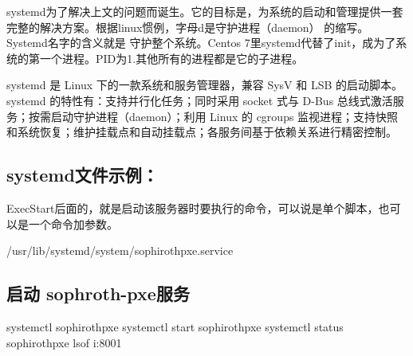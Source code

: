 \documentclass[letterpaper,10pt,english]{sphinxmanual}
\begin{document}
systemd为了解决上文的问题而诞生。它的目标是，为系统的启动和管理提供一套完整的解决方案。根据linux惯例，字母d是守护进程（daemon） 的缩写。Systemd名字的含义就是 守护整个系统。Centos 7里systemd代替了init，成为了系统的第一个进程。PID为1.其他所有的进程都是它的子进程。

systemd 是 Linux 下的一款系统和服务管理器，兼容 SysV 和 LSB 的启动脚本。systemd 的特性有：支持并行化任务；同时采用 socket 式与 D-Bus 总线式激活服务；按需启动守护进程（daemon）；利用 Linux 的 cgroups 监视进程；支持快照和系统恢复；维护挂载点和自动挂载点；各服务间基于依赖关系进行精密控制。


\subsection{systemd文件示例：}
\label{\detokenize{common_service/systemd:id3}}
ExecStart后面的，就是启动该服务器时要执行的命令，可以说是单个脚本，也可以是一个命令加参数。

%
\begin{sphinxVerbatim}[commandchars=\\\{\},numbers=left,firstnumber=1,stepnumber=1]
 


 \PYGZgt{} /usr/lib/systemd/system/sophiroth\PYGZhy{}pxe.service
\end{sphinxVerbatim}


\subsection{启动 sophroth-pxe服务}
\label{\detokenize{common_service/systemd:sophroth-pxe}}
%
\begin{sphinxVerbatim}[commandchars=\\\{\},numbers=left,firstnumber=1,stepnumber=1]
systemctl  sophiroth\PYGZhy{}pxe
systemctl start sophiroth\PYGZhy{}pxe
systemctl status sophiroth\PYGZhy{}pxe
lsof \PYGZhy{}i:8001
\end{sphinxVerbatim}
\end{document}
